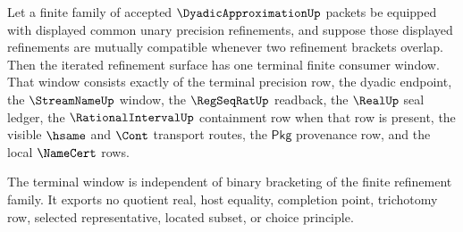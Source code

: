 \begin{theorem}\label{thm:dyadicapproximation-terminal-refinement-window}
Let a finite family of accepted $\DyadicApproximationUp$ packets be equipped
with displayed common unary precision refinements, and suppose those displayed
refinements are mutually compatible whenever two refinement brackets overlap.
Then the iterated refinement surface has one terminal finite consumer window.
That window consists exactly of the terminal precision row, the dyadic endpoint,
the $\StreamNameUp$ window, the $\RegSeqRatUp$ readback, the $\RealUp$ seal
ledger, the $\RationalIntervalUp$ containment row when that row is present, the
visible $\hsame$ and $\Cont$ transport routes, the $\mathsf{Pkg}$ provenance
row, and the local $\NameCert$ rows.

The terminal window is independent of binary bracketing of the finite
refinement family. It exports no quotient real, host equality, completion
point, trichotomy row, selected representative, located subset, or choice
principle.
\end{theorem}
